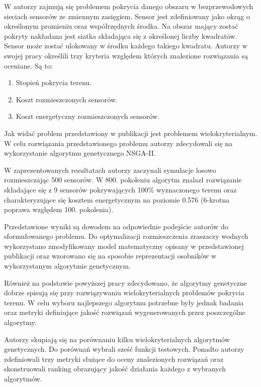 \documentclass[twoside]{iisthesis}
\begin{document}
W \cite{sensors} autorzy zajmują się problemem pokrycia danego obszaru w bezprzewodowych sieciach sensorów ze zmiennym zasięgiem. Sensor jest zdefiniowany jako okrąg o określonym promieniu oraz współrzędnych środka. Na obszar mający zostać pokryty nakładana jest siatka składająca się z określonej liczby kwadratów. Sensor może zostać ulokowany w środku każdego takiego kwadratu. Autorzy w swojej pracy określili trzy kryteria względem których znalezione rozwiązania są oceniane. Są to:\\
\begin{enumerate}
	\item Stopień pokrycia terenu.
	\item Koszt rozmieszczonych sensorów.
	\item Koszt energetyczny rozmieszczonych sensorów.\\
\end{enumerate}
Jak widać problem przedstawiony w publikacji jest problemem wielokryterialnym. W celu rozwiązania przedstawionego problemu autorzy zdecydowali się na wykorzystanie algorytmu genetycznego NSGA-II.

W zaprezentowanych rezultatach autorzy zaczynali symulacje losowo rozmieszczając 500 sensorów. W 800. pokoleniu algorytm znalazł rozwiązanie składające się z 9 sensorów pokrywających 100\% wyznaczonego terenu oraz charakteryzujące się kosztem energetycznym na poziomie 0.576 (6-krotna poprawa względem 100. pokolenia).

Przedstawione wyniki są dowodem na odpowiednie podejście autorów do sformułowanego problemu. Do optymalizacji rozmieszczenia zraszaczy wodnych wykorzystano zmodyfikowany model matematyczny opisany w przedstawionej publikacji oraz wzorowano się na sposobie reprezentacji osobników w wykorzystanym algorytmie genetycznym.

Również na podstawie powyższej pracy zdecydowano, że algorytmy genetyczne dobrze spisują się przy rozwiązywaniu wielokryterialnych problemów pokrycia terenu. W celu wyboru najlepszego algorytmu potrzebne były jednak badania oraz metryki definiujące jakość rozwiązań wygenerowanych przez poszczególne algorytmy.

Autorzy \cite{comparison_deb} skupiają się na porównaniu kilku wielokryterialnych algorytmów genetycznych. Do porównań wybrali sześć funkcji testowych. Ponadto autorzy zdefiniowali trzy metryki służące do oceny znalezionych rozwiązań oraz skonstruowali ranking obrazujący jakość działania każdego z wybranych algorytmów.
\end{document}
